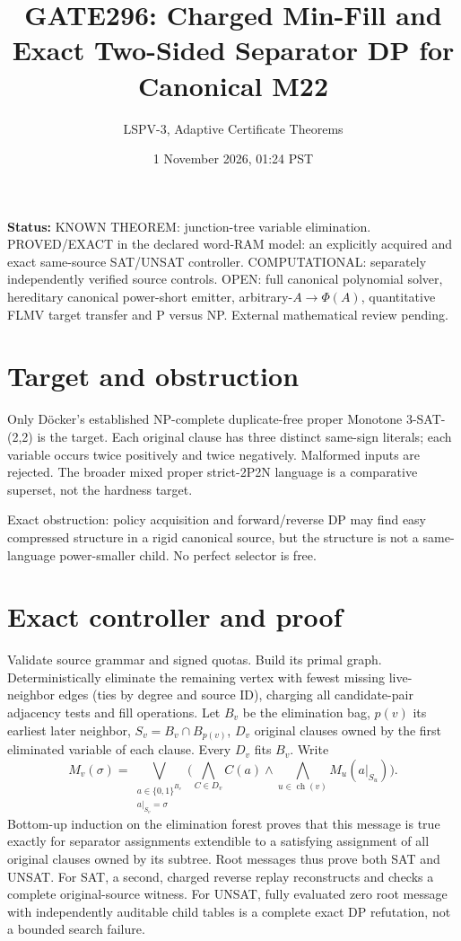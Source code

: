 \documentclass[11pt]{article}
\title{GATE296: Charged Min-Fill and Exact Two-Sided Separator DP for Canonical M22}
\author{LSPV-3, Adaptive Certificate Theorems}
\date{1 November 2026, 01:24 PST}
\begin{document}
\maketitle
\noindent\textbf{Status:} KNOWN THEOREM: junction-tree variable elimination. PROVED/EXACT in the declared word-RAM model: an explicitly acquired and exact same-source SAT/UNSAT controller. COMPUTATIONAL: separately independently verified source controls. OPEN: full canonical polynomial solver, hereditary canonical power-short emitter, arbitrary-$A\to\Phi(A)$, quantitative FLMV target transfer and P versus NP. External mathematical review pending.

\section{Target and obstruction}
Only D\"ocker's established NP-complete duplicate-free proper Monotone 3-SAT-(2,2) is the target. Each original clause has three distinct same-sign literals; each variable occurs twice positively and twice negatively. Malformed inputs are rejected. The broader mixed proper strict-2P2N language is a comparative superset, not the hardness target.

\noindent Exact obstruction: policy acquisition and forward/reverse DP may find easy compressed structure in a rigid canonical source, but the structure is not a same-language power-smaller child. No perfect selector is free.

\section{Exact controller and proof}
Validate source grammar and signed quotas. Build its primal graph. Deterministically eliminate the remaining vertex with fewest missing live-neighbor edges (ties by degree and source ID), charging all candidate-pair adjacency tests and fill operations. Let $B_v$ be the elimination bag, $p(v)$ its earliest later neighbor, $S_v=B_v\cap B_{p(v)}$, $D_v$ original clauses owned by the first eliminated variable of each clause. Every $D_v$ fits $B_v$. Write
\[
M_v(\sigma)=\bigvee_{\substack{a\in\{0,1\}^{B_v}\\a|_{S_v}=\sigma}}
\biggl(\bigwedge_{C\in D_v}C(a)\land\bigwedge_{u\in\operatorname{ch}(v)}
M_u(a|_{S_u})\biggr).
\]
Bottom-up induction on the elimination forest proves that this message is true exactly for separator assignments extendible to a satisfying assignment of all original clauses owned by its subtree. Root messages thus prove both SAT and UNSAT. For SAT, a second, charged reverse replay reconstructs and checks a complete original-source witness. For UNSAT, fully evaluated zero root message with independently auditable child tables is a complete exact DP refutation, not a bounded search failure.
\end{document}
